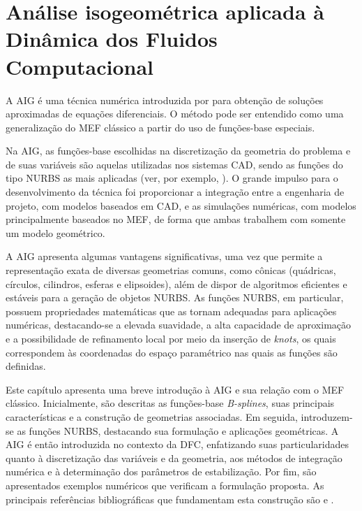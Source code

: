 \chapter[Análise isogeométrica aplicada à Dinâmica dos Fluidos Computacional]{Análise isogeométrica aplicada à Dinâmica dos Fluidos Computacional} \label{capitulo:Cap3}

A AIG é uma técnica numérica introduzida por  para obtenção de soluções aproximadas de equações diferenciais. O método pode ser entendido como uma generalização do MEF clássico a partir do uso de funções-base especiais. 

Na AIG, as funções-base escolhidas na discretização da geometria do problema e de suas variáveis são aquelas utilizadas nos sistemas CAD, sendo as funções do tipo NURBS as mais aplicadas (ver, por exemplo, ). O grande impulso para o desenvolvimento da técnica foi proporcionar a integração entre a engenharia de projeto, com modelos baseados em CAD, e as simulações numéricas, com modelos principalmente baseados no MEF, de forma que ambas trabalhem com somente um modelo geométrico.

A AIG apresenta algumas vantagens significativas, uma vez que permite a representação exata de diversas geometrias comuns, como cônicas (quádricas, círculos, cilindros, esferas e elipsoides), além de dispor de algoritmos eficientes e estáveis para a geração de objetos NURBS. As funções NURBS, em particular, possuem propriedades matemáticas que as tornam adequadas para aplicações numéricas, destacando-se a elevada suavidade, a alta capacidade de aproximação e a possibilidade de refinamento local por meio da inserção de \textit{knots}, os quais correspondem às coordenadas do espaço paramétrico nas quais as funções são definidas.

Este capítulo apresenta uma breve introdução à AIG e sua relação com o MEF clássico. Inicialmente, são descritas as funções-base \textit{B-splines}, suas principais características e a construção de geometrias associadas. Em seguida, introduzem-se as funções NURBS, destacando sua formulação e aplicações geométricas. A AIG é então introduzida no contexto da DFC, enfatizando suas particularidades quanto à discretização das variáveis e da geometria, aos métodos de integração numérica e à determinação dos parâmetros de estabilização. Por fim, são apresentados exemplos numéricos que verificam a formulação proposta. As principais referências bibliográficas que fundamentam esta construção são  e . 
 

